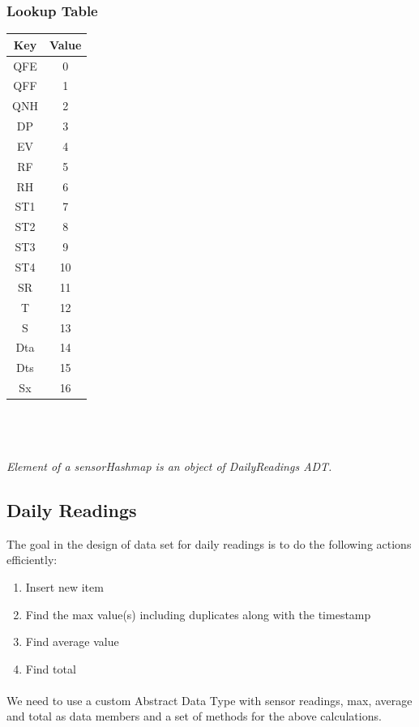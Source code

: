 \documentclass[12pt]{article}
\begin{document}
\subsubsection{Lookup Table}
\begin{tabular}{| c | c |}
	\hline
	Key & Value \\
	\hline
	QFE & 0 \\
	\hline
	QFF & 1 \\
	\hline
	QNH & 2 \\
	\hline
	DP & 3 \\
	\hline
	EV & 4 \\
	\hline
	RF & 5 \\
	\hline
	RH & 6 \\
	\hline
	ST1 & 7 \\
	\hline
	ST2 & 8 \\
	\hline
	ST3 & 9 \\
	\hline
	ST4 & 10 \\
	\hline
	SR  & 11 \\
	\hline
	T & 12 \\
	\hline
	S & 13 \\
	\hline
	Dta & 14 \\
	\hline
	Dts & 15 \\
	\hline
	Sx & 16 \\
	\hline
\end{tabular}
\\ \\ \\
{\em Element of a sensorHashmap is an object of DailyReadings ADT.}
\subsection{Daily Readings}
The goal in the design of data set for daily readings is to do the following actions efficiently:  
\begin{enumerate}
	\item Insert new item
	\item Find the max value(s) including duplicates along with the timestamp
	\item Find average value
	\item Find total
\end{enumerate}
\paragraph{}We need to use a custom Abstract Data Type with sensor readings, max, average and total as data members and a set of methods for the above calculations.
\end{document}
